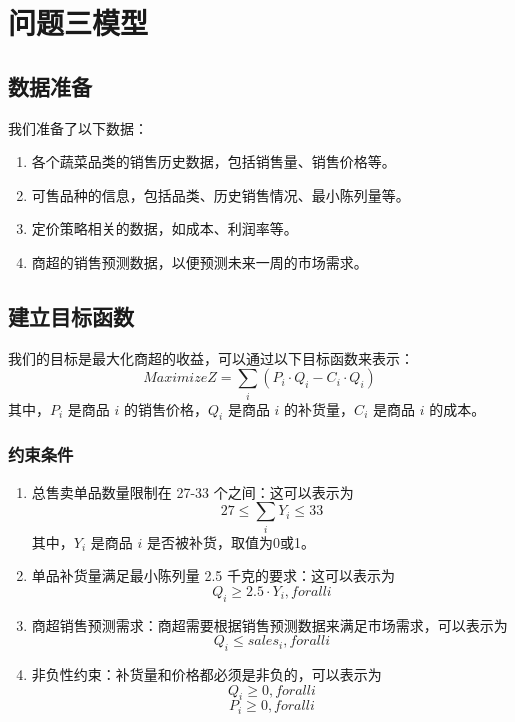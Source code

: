 \documentclass[withoutpreface,bwprint]{cumcmthesis} %
\begin{document}
	\section{问题三模型}
		\subsection{数据准备}
		我们准备了以下数据：
		\begin{enumerate}
			\item 各个蔬菜品类的销售历史数据，包括销售量、销售价格等。
			\item 可售品种的信息，包括品类、历史销售情况、最小陈列量等。
			\item 定价策略相关的数据，如成本、利润率等。
			\item 商超的销售预测数据，以便预测未来一周的市场需求。
		\end{enumerate}
		
		\subsection{建立目标函数}
		我们的目标是最大化商超的收益，可以通过以下目标函数来表示：
		\begin{equation}
			Maximize Z = \sum_{i} (P_i \cdot Q_i - C_i \cdot Q_i)
		\end{equation}
		其中，$P_i$ 是商品 $i$ 的销售价格，$Q_i$ 是商品 $i$ 的补货量，$C_i$ 是商品 $i$ 的成本。
		
		\subsubsection{约束条件}
		\begin{enumerate}
			\item 总售卖单品数量限制在 27-33 个之间：这可以表示为
			\begin{equation}
				27 \leq \sum_{i} Y_i \leq 33
			\end{equation}
			其中，$Y_i$ 是商品 $i$ 是否被补货，取值为0或1。
			
			\item 单品补货量满足最小陈列量 2.5 千克的要求：这可以表示为
			\begin{equation}
				Q_i \geq 2.5 \cdot Y_i,      for all  i
			\end{equation}
			
			\item 商超销售预测需求：商超需要根据销售预测数据来满足市场需求，可以表示为
			\begin{equation}
				Q_i \leq     sales_i,     for all  i
			\end{equation}
			
			\item 非负性约束：补货量和价格都必须是非负的，可以表示为
			\begin{equation}
				Q_i \geq 0,      for all  i
			\end{equation}
			\begin{equation}
				P_i \geq 0,     for all  i
			\end{equation}
		\end{enumerate}
		
\end{document}

